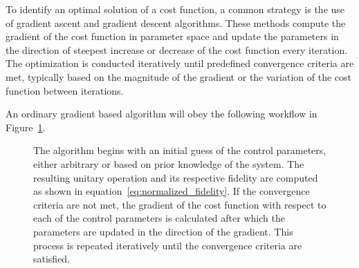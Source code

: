 To identify an optimal solution of a cost function, a common strategy is the use of gradient ascent and gradient descent algorithms. These methods compute the gradient of the cost function in parameter space and update the parameters in the direction of steepest increase or decrease of the cost function every iteration. The optimization is conducted iteratively until predefined convergence criteria are met, typically based on the magnitude of the gradient or the variation of the cost function between iterations.

An ordinary gradient based algorithm will obey the following workflow in Figure~\ref{fig:grape_flowchart}.

\begin{figure}[ht]
    \centering
    \caption{The algorithm begins with an initial guess of the control parameters, either arbitrary or based on prior knowledge of the system. The resulting unitary operation and its respective fidelity are computed as shown in equation~\ref{eq:normalized_fidelity}. If the convergence criteria are not met, the gradient of the cost function with respect to each of the control parameters is calculated after which the parameters are updated in the direction of the gradient. This process is repeated iteratively until the convergence criteria are satisfied.}
    \label{fig:grape_flowchart}
\end{figure}

